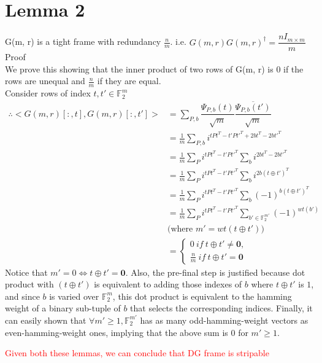 \documentclass[12pt]{article}
\begin{document}
{\section{Lemma 2}
G(m, r) is a tight frame with redundancy $\frac{n}{m}$. i.e. $G(m, r)G(m, r)^\dagger = \dfrac{nI_{m \times m}}{m}$\\
Proof\\
We prove this showing that the inner product of two rows of G(m, r) is $0$ if the rows are unequal and $\frac{n}{m}$ if they are equal.\\
Consider rows of index $t, t' \in \mathbb{F}_2^m$
\begin{align*}
    \therefore <G(m, r)[:, t], G(m, r)[:, t']> &= \sum_{P, b} \dfrac{\Psi_{P, b}(t)}{\sqrt{m}} \overline{\dfrac{\Psi_{P, b}(t')}{\sqrt{m}}}\\
    &= \frac{1}{m} \sum_{P, b} i^{tPt^T - t'Pt'^T + 2bt^T - 2bt'^T}\\
    &= \frac{1}{m} \sum_{P}  i^{tPt^T - t'Pt'^T} \sum_{b} i^{2bt^T - 2bt'^T}\\
    &= \frac{1}{m} \sum_{P}  i^{tPt^T - t'Pt'^T} \sum_{b} i^{2b(t \oplus t')^T}\\
    &= \frac{1}{m} \sum_{P}  i^{tPt^T - t'Pt'^T} \sum_{b} (-1)^{b(t \oplus t')^T}\\
    &= \frac{1}{m} \sum_{P}  i^{tPt^T - t'Pt'^T} \sum_{b' \in \mathbb{F}_2^{m'}} (-1)^{wt(b')}\\
    &\text{(where $m' = wt(t \oplus t')$)}\\
    &= \begin{cases}
    0\ if\ t \oplus t' \neq \textbf{0},\\
    \frac{n}{m}\ if\ t \oplus t' = \textbf{0}
    \end{cases}
\end{align*}
Notice that $m' = 0 \iff t \oplus t' = \textbf{0}$. Also, the pre-final step is justified because dot product with $(t \oplus t')$ is equivalent to adding those indexes of $b$ where $t \oplus t'$ is $1$, and since $b$ is varied over $\mathbb{F}_2^m$, this dot product is equivalent to the hamming weight of a binary sub-tuple of $b$ that selects the corresponding indices. Finally, it can easily shown that $\forall m' \geq 1, \mathbb{F}_2^{m'}$ has as many odd-hamming-weight vectors as even-hamming-weight ones, implying that the above sum is 0 for $m' \geq 1$.

\textcolor{red}{Given both these lemmas, we can conclude that DG frame is stripable}
}
\end{document}
